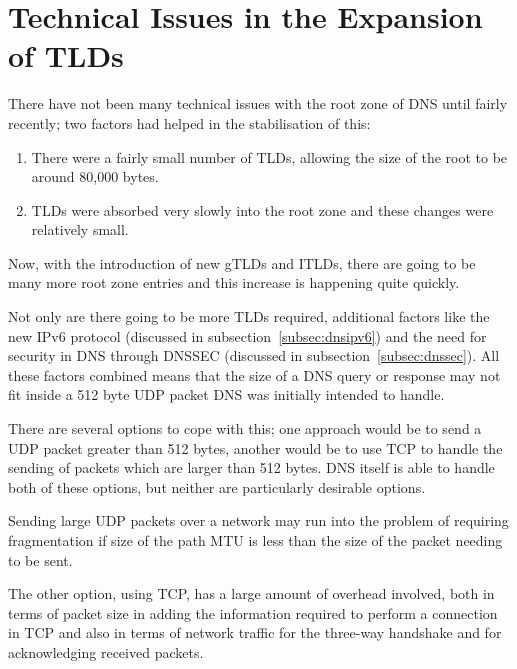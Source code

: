 \documentclass[11pt, a4paper]{article}
\begin{document}



\newpage
\section{Technical Issues in the Expansion of TLDs}

There have not been many technical issues with the root zone of \gls{DNS} until
fairly recently; two factors had helped in the stabilisation of 
this\cite{manning2011challenges}:

\begin{enumerate}
\item There were a fairly small number of \glspl{TLD}, allowing the size of the
      root to be around 80,000 bytes.
\item \glspl{TLD} were absorbed very slowly into the root zone and these
      changes were relatively small.
\end{enumerate}

Now, with the introduction of new \glspl{gTLD} and \glspl{ITLD}, there are 
going to be many more root zone entries and this increase is happening quite
quickly.

Not only are there going to be more \glspl{TLD} required, additional factors
like the new IPv6 protocol (discussed in subsection~\ref{subsec:dnsipv6}) and 
the need for security in \gls{DNS} through \gls{DNSSEC}\cite{rfc2535} 
(discussed in subsection~\ref{subsec:dnssec}). All these factors combined means
that the size of a \gls{DNS} query or response may not fit inside a 512 byte 
\gls{UDP} packet \gls{DNS} was initially intended to handle.

There are several options to cope with this; one approach would be to send a
\gls{UDP} packet greater than 512 bytes, another would be to use \gls{TCP} to
handle the sending of packets which are larger than 512 bytes. \gls{DNS} itself
is able to handle both of these options, but neither are particularly desirable
options.

Sending large \gls{UDP} packets over a network may run into the problem of 
requiring fragmentation if size of the path \gls{MTU} is less than the size of
the packet needing to be sent.

The other option, using \gls{TCP}, has a large amount of overhead involved, 
both in terms of packet size in adding the information required to perform a
connection in \gls{TCP} and also in terms of network traffic for the three-way 
handshake and for acknowledging received packets.
\end{document}
